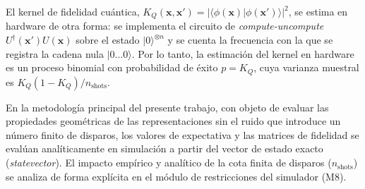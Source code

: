 El kernel de fidelidad cuántica, $K_Q(\mathbf{x}, \mathbf{x}') = |\langle \phi(\mathbf{x}) | \phi(\mathbf{x}') \rangle|^2$,
se estima en hardware de otra forma: se implementa el circuito de
\textit{compute-uncompute} $U^\dagger(\mathbf{x}') U(\mathbf{x})$ sobre el estado
$|0\rangle^{\otimes n}$ y se cuenta la frecuencia con la que se registra
la cadena nula $|0\dots 0\rangle$. Por lo tanto, la estimación del kernel en hardware
es un proceso binomial con probabilidad de éxito $p = K_Q$, cuya
varianza muestral es $K_Q(1 - K_Q)/n_{\text{shots}}$.

En la metodología principal del presente trabajo, con objeto de evaluar las
propiedades geométricas de las representaciones sin el ruido
que introduce un número finito de disparos, los valores de
expectativa y las matrices de fidelidad se evalúan analíticamente en simulación a
partir del vector de estado exacto (\textit{statevector}). El impacto empírico y
analítico de la cota finita de disparos ($n_{\text{shots}}$) se analiza de forma
explícita en el módulo de restricciones del simulador (M8).

